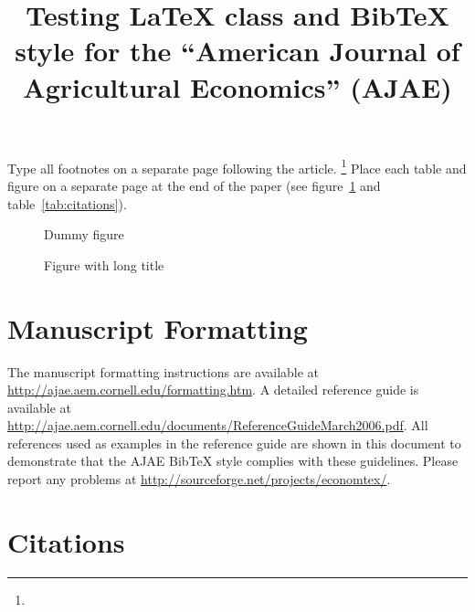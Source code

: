 \documentclass{ajae}
\title{Testing \LaTeX{} class and Bib\TeX{} style for the
   ``American Journal of Agricultural Economics'' (AJAE)}
\begin{document}
\maketitle

\begin{abstract}
\end{abstract}



Type all footnotes on a separate page following the article.%
\footnote{
} 
Place each table and figure on a separate page at the end of the paper
(see figure~\ref{fig:dummy} and table~\ref{tab:citations}).

\begin{figure}[htbp]
\caption{Dummy figure}
\label{fig:dummy}
\end{figure}

\begin{figure}[htbp]
\caption{Figure with  long title}
\label{fig:long-title}
\end{figure}


\section{Manuscript Formatting}
The manuscript formatting instructions are available at
\url{http://ajae.aem.cornell.edu/formatting.htm}.
A detailed reference guide is available at
\url{http://ajae.aem.cornell.edu/documents/ReferenceGuideMarch2006.pdf}.
All references used as examples in the reference guide are shown in this document
to demonstrate that the AJAE Bib\TeX{} style complies with these guidelines.
Please report any problems at
\url{http://sourceforge.net/projects/economtex/}.


\section{Citations}
\end{document}
